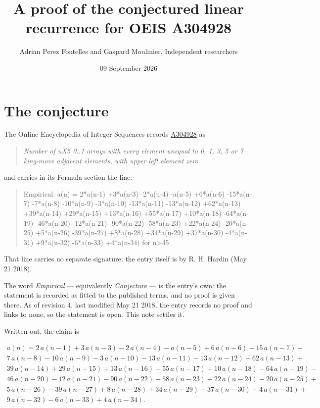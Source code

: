 \documentclass[11pt]{article}
\title{A proof of the conjectured linear recurrence for OEIS A304928}
\author{Adrian Perez Fontelles and Gaspard Moulinier, Independent researchers}
\date{09 September 2026}
\theoremstyle{definition}
\begin{document}
\maketitle
\section{The conjecture}

The Online Encyclopedia of Integer Sequences records \href{https://oeis.org/A304928}{A304928} as

\begin{quote}\itshape Number of nX5 0..1 arrays with every element unequal to 0, 1, 3, 5 or 7 king-move adjacent elements, with upper left element zero\end{quote}

and carries in its Formula section the line:

\begin{quote}\ttfamily Empirical: a(n) = 2*a(n-1) +3*a(n-3) -2*a(n-4) -a(n-5) +6*a(n-6) -15*a(n-7) -7*a(n-8) -10*a(n-9) -3*a(n-10) -13*a(n-11) -13*a(n-12) +62*a(n-13) +39*a(n-14) +29*a(n-15) +13*a(n-16) +55*a(n-17) +10*a(n-18) -64*a(n-19) -46*a(n-20) -12*a(n-21) -90*a(n-22) -58*a(n-23) +22*a(n-24) -20*a(n-25) +5*a(n-26) -39*a(n-27) +8*a(n-28) +34*a(n-29) +37*a(n-30) -4*a(n-31) +9*a(n-32) -6*a(n-33) +4*a(n-34) for n>45\end{quote}

That line carries no separate signature; the entry itself is by R. H. Hardin (May 21 2018).

The word {\itshape Empirical} --- equivalently {\itshape Conjecture} --- is the entry's own: the statement is recorded as fitted to the published terms, and no proof is given there. As of revision 4, last modified May 21 2018, the entry records no proof and links to none, so the statement is open. This note settles it.

Written out, the claim is

\begin{multline*} a(n) = 2\,a(n-1) + 3\,a(n-3) - 2\,a(n-4) - a(n-5) + 6\,a(n-6) - 15\,a(n-7) - \\ 7\,a(n-8) - 10\,a(n-9) - 3\,a(n-10) - 13\,a(n-11) - 13\,a(n-12) + 62\,a(n-13) + \\ 39\,a(n-14) + 29\,a(n-15) + 13\,a(n-16) + 55\,a(n-17) + 10\,a(n-18) - 64\,a(n-19) - \\ 46\,a(n-20) - 12\,a(n-21) - 90\,a(n-22) - 58\,a(n-23) + 22\,a(n-24) - 20\,a(n-25) + \\ 5\,a(n-26) - 39\,a(n-27) + 8\,a(n-28) + 34\,a(n-29) + 37\,a(n-30) - 4\,a(n-31) + \\ 9\,a(n-32) - 6\,a(n-33) + 4\,a(n-34). \end{multline*}
\end{document}
